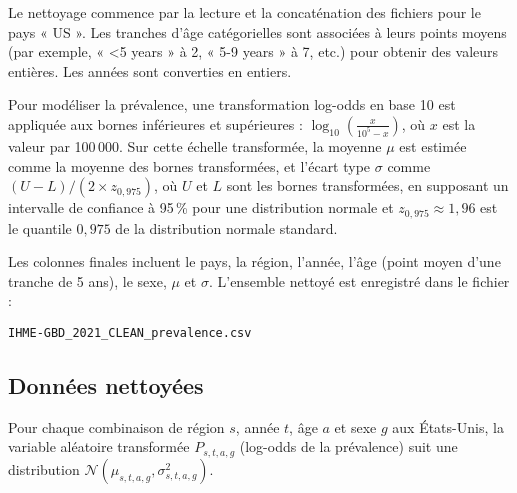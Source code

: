 Le nettoyage commence par la lecture et la concaténation des fichiers pour le pays « US ». Les tranches d'âge catégorielles sont associées à leurs points moyens (par exemple, « <5 years » à 2, « 5-9 years » à 7, etc.) pour obtenir des valeurs entières. Les années sont converties en entiers.

Pour modéliser la prévalence, une transformation log-odds en base 10 est appliquée aux bornes inférieures et supérieures : $\log_{10} \left( \frac{x}{10^5 - x} \right)$, où $x$ est la valeur par 100\,000. Sur cette échelle transformée, la moyenne $\mu$ est estimée comme la moyenne des bornes transformées, et l'écart type $\sigma$ comme $(U - L) / (2 \times z_{0,975})$, où $U$ et $L$ sont les bornes transformées, en supposant un intervalle de confiance à 95\,\% pour une distribution normale et $z_{0,975} \approx 1{,}96$ est le quantile $0,975$ de la distribution normale standard.

Les colonnes finales incluent le pays, la région, l'année, l'âge (point moyen d'une tranche de 5 ans), le sexe, $\mu$ et $\sigma$. L'ensemble nettoyé est enregistré dans le fichier : 
\begin{center}
	 \texttt{IHME-GBD\_2021\_CLEAN\_prevalence.csv}
\end{center}

\subsection{Données nettoyées}
Pour chaque combinaison de région $s$, année $t$, âge $a$ et sexe $g$ aux États-Unis, la variable aléatoire transformée $P_{s,t,a,g}$ (log-odds de la prévalence) suit une distribution $\mathcal{N}(\mu_{s,t,a,g}, \sigma_{s,t,a,g}^2)$.